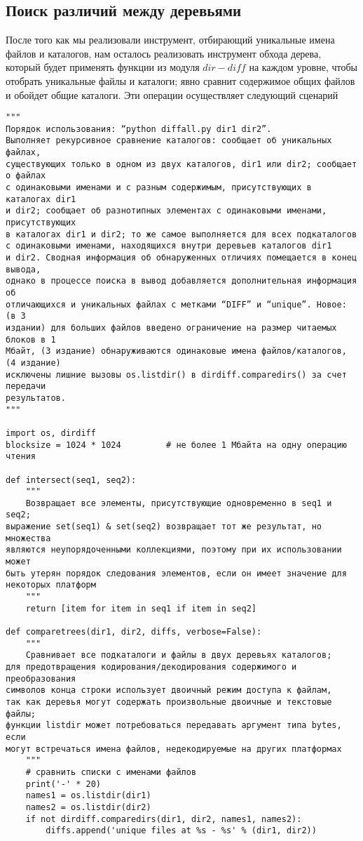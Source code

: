 \documentclass[12pt]{article}
\begin{document}
\subsection{Поиск различий между деревьями}
После того как мы реализовали инструмент, отбирающий уникальные
имена файлов и каталогов, нам осталось реализовать инструмент обхода дерева, который будет применять функции из модуля $dir-diff$ на каждом уровне, чтобы отобрать уникальные файлы и каталоги;
явно сравнит содержимое общих файлов и обойдет общие каталоги. Эти
операции осуществляет следующий сценарий
\begin{verbatim}
"""
Порядок использования: “python diffall.py dir1 dir2”.
Выполняет рекурсивное сравнение каталогов: сообщает об уникальных файлах,
существующих только в одном из двух каталогов, dir1 или dir2; сообщает о файлах
с одинаковыми именами и с разным содержимым, присутствующих в каталогах dir1
и dir2; сообщает об разнотипных элементах с одинаковыми именами, присутствующих
в каталогах dir1 и dir2; то же самое выполняется для всех подкаталогов
с одинаковыми именами, находящихся внутри деревьев каталогов dir1
и dir2. Сводная информация об обнаруженных отличиях помещается в конец вывода,
однако в процессе поиска в вывод добавляется дополнительная информация об
отличающихся и уникальных файлах с метками “DIFF” и “unique”. Новое: (в 3
издании) для больших файлов введено ограничение на размер читаемых блоков в 1
Мбайт, (3 издание) обнаруживаются одинаковые имена файлов/каталогов, (4 издание)
исключены лишние вызовы os.listdir() в dirdiff.comparedirs() за счет передачи
результатов.
"""

import os, dirdiff
blocksize = 1024 * 1024         # не более 1 Мбайта на одну операцию чтения

def intersect(seq1, seq2):
    """
    Возвращает все элементы, присутствующие одновременно в seq1 и seq2;
выражение set(seq1) & set(seq2) возвращает тот же результат, но множества
являются неупорядоченными коллекциями, поэтому при их использовании может
быть утерян порядок следования элементов, если он имеет значение для
некоторых платформ
    """
    return [item for item in seq1 if item in seq2]

def comparetrees(dir1, dir2, diffs, verbose=False):
    """
    Сравнивает все подкаталоги и файлы в двух деревьях каталогов;
для предотвращения кодирования/декодирования содержимого и преобразования
символов конца строки использует двоичный режим доступа к файлам,
так как деревья могут содержать произвольные двоичные и текстовые файлы;
функции listdir может потребоваться передавать аргумент типа bytes, если
могут встречаться имена файлов, недекодируемые на других платформах
    """
    # сравнить списки с именами файлов
    print('-' * 20)
    names1 = os.listdir(dir1)
    names2 = os.listdir(dir2)
    if not dirdiff.comparedirs(dir1, dir2, names1, names2):
        diffs.append('unique files at %s - %s' % (dir1, dir2))


\end{verbatim}
\end{document}
